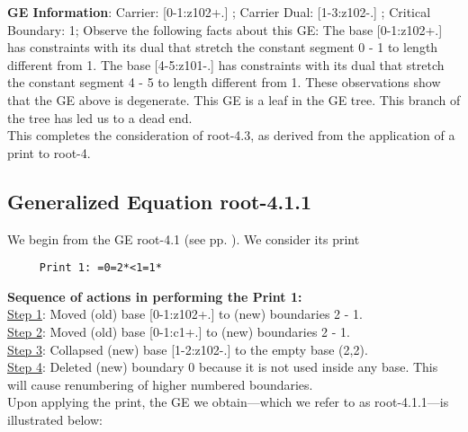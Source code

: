 \documentclass[final]{article}
\begin{document}
{\bf GE Information}:  
Carrier: [0-1:z102+.] ;  
Carrier Dual: [1-3:z102-.] ;  
Critical Boundary: 1;  
Observe the following facts about this GE:
The base [0-1:z102+.]  has constraints with its dual that stretch the constant segment 0 - 1 to length different from 1.  The base [4-5:z101-.]  has constraints with its dual that stretch the constant segment 4 - 5 to length different from 1.  These observations show that the GE above is degenerate.  This GE is a leaf in the GE tree.  This branch of the tree has led us to a dead end.\\[0.1in]
This completes the consideration of root-4.3, as derived from the application of a print to root-4.\\[0.1in]
\subsection*{Generalized Equation root-4.1.1}
\label{root-4.1.1}We begin from the GE root-4.1 (see pp. \pageref{root-4.1}).  {We consider its print}
\begin{verbatim}
     Print 1: =0=2*<1=1*
\end{verbatim}
{\bf Sequence of actions in performing the Print 1:}\\
{\underline{Step 1}:} Moved (old) base [0-1:z102+.]  to (new) boundaries 2 - 1.\\
{\underline{Step 2}:} Moved (old) base [0-1:c1+.]  to (new) boundaries 2 - 1.\\
{\underline{Step 3}:} Collapsed (new) base [1-2:z102-.]  to the empty base (2,2).
\\
{\underline{Step 4}:} Deleted (new) boundary 0 because it is not used inside any base.  This will cause renumbering of higher numbered boundaries.
\\[0.1in]
{Upon applying the print, the GE we obtain---which we refer to as root-4.1.1---is illustrated below:}
\end{document}
